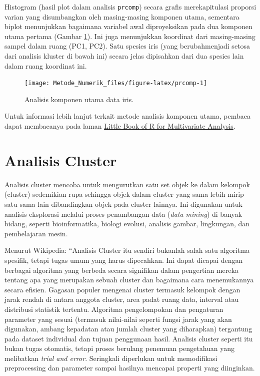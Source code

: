 \documentclass[]{book}
\theoremstyle{definition}
\theoremstyle{definition}
\theoremstyle{definition}
\theoremstyle{remark}
\begin{document}
Histogram (hasil plot dalam analisis \texttt{prcomp}) secara grafis merekapitulasi proporsi varian yang disumbangkan oleh masing-masing komponen utama, sementara biplot menunjukkan bagaimana variabel awal diproyeksikan pada dua komponen utama pertama (Gambar \ref{fig:prcomp}). Ini juga menunjukkan koordinat dari masing-masing sampel dalam ruang (PC1, PC2). Satu spesies iris (yang berubahmenjadi setosa dari analisis kluster di bawah ini) secara jelas dipisahkan dari dua spesies lain dalam ruang koordinat ini.

\begin{figure}

{\centering \texttt{[image: Metode\_Numerik\_files/figure-latex/prcomp-1]} 

}

\caption{Analisis komponen utama data iris.}\label{fig:prcomp}
\end{figure}

Untuk informasi lebih lanjut terkait metode analisis komponen utama, pembaca dapat membacanya pada laman \href{https://little-book-of-r-for-multivariate-analysis.readthedocs.io/en/latest/}{Little Book of R for Multivariate Analysis}.

\hypertarget{analisis-cluster}{%
\section{Analisis Cluster}\label{analisis-cluster}}

Analisis cluster mencoba untuk mengurutkan satu set objek ke dalam kelompok (cluster) sedemikian rupa sehingga objek dalam cluster yang sama lebih mirip satu sama lain dibandingkan objek pada cluster lainnya. Ini digunakan untuk analisis eksplorasi melalui proses penambangan data (\emph{data mining}) di banyak bidang, seperti bioinformatika, biologi evolusi, analisis gambar, lingkungan, dan pembelajaran mesin.

Menurut Wikipedia: ``Analisis Cluster itu sendiri bukanlah salah satu algoritma spesifik, tetapi tugas umum yang harus dipecahkan. Ini dapat dicapai dengan berbagai algoritma yang berbeda secara signifikan dalam pengertian mereka tentang apa yang merupakan sebuah cluster dan bagaimana cara menemukannya secara efisien. Gagasan populer mengenai cluster termasuk kelompok dengan jarak rendah di antara anggota cluster, area padat ruang data, interval atau distribusi statistik tertentu. Algoritma pengelompokan dan pengaturan parameter yang sesuai (termasuk nilai-nilai seperti fungsi jarak yang akan digunakan, ambang kepadatan atau jumlah cluster yang diharapkan) tergantung pada dataset individual dan tujuan penggunaan hasil. Analisis cluster seperti itu bukan tugas otomatis, tetapi proses berulang penemuan pengetahuan yang melibatkan \emph{trial and error}. Seringkali diperlukan untuk memodifikasi preprocessing dan parameter sampai hasilnya mencapai properti yang diinginkan.
\end{document}
